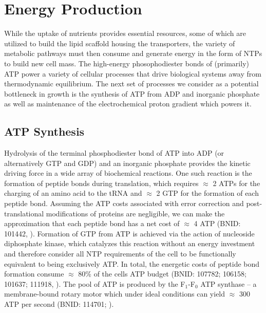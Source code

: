 \section{Energy Production}
While the uptake of nutrients provides essential resources, some of which are
utilized to build the lipid scaffold housing the transporters, the variety of
metabolic pathways must then consume and generate energy in the form of NTPs
to build new cell mass. The high-energy phosophodiester bonds of (primarily)
ATP power a variety of cellular processes that drive biological systems away
from thermodynamic equilibrium. The next set of processes we consider as a
potential bottleneck in growth is the synthesis of ATP from ADP and inorganic
phosphate as well as maintenance of the electrochemical proton gradient which
powers it.

\subsection{ATP Synthesis}
Hydrolysis of the terminal phosphodiester bond of ATP into ADP (or
alternatively GTP and GDP) and an inorganic phosphate provides the kinetic driving
force in a wide array of biochemical reactions. One such reaction is the
formation of peptide bonds during translation, which requires $\approx$ 2 ATPs
for the charging of an amino acid to the tRNA and $\approx$ 2 GTP for the
formation of each peptide bond. Assuming the ATP costs
associated with error correction and post-translational modifications of
proteins are negligible, we can make the approximation that each peptide bond
has a net cost of $\approx$ 4 ATP (BNID: 101442, \cite{milo2010}). Formation
of GTP from ATP is achieved via the action of nucleoside diphosphate kinase,
which catalyzes this reaction without an energy investment \citep{lascu2000}
and therefore consider all NTP requirements of the cell to be functionally
equivalent to being exclusively ATP. In total, the energetic costs of peptide
bond formation consume $\approx$ 80\% of the cells ATP budget (BNID: 107782;
106158; 101637; 111918, \cite{lynch2015,stouthamer1973}). The pool of ATP is
produced by the F$_1$-F$_0$ ATP synthase -- a membrane-bound rotary motor
which under ideal conditions can yield $\approx$ 300 ATP per second (BNID:
114701; \cite{weber2003}).

